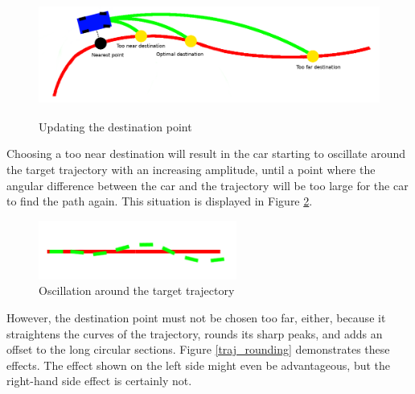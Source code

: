 \begin{figure}[!ht]
    \centering
    \includegraphics[height=40mm]{figures/raw/dest_point_update.png}
    \caption{Updating the destination point}
    \label{dest_point_update}
\end{figure}

Choosing a too near destination will result in the car starting to oscillate around the target trajectory with an increasing amplitude, until a point where the angular difference between the car and the trajectory will be too large for the car to find the path again. This situation is displayed in Figure \ref{traj_oscillation}.

\begin{figure}[!ht]
    \centering
    \includegraphics[width=65mm]{figures/raw/traj_oscillation.png}
    \caption{Oscillation around the target trajectory}
    \label{traj_oscillation}
\end{figure}

However, the destination point must not be chosen too far, either, because it straightens the curves of the trajectory, rounds its sharp peaks, and adds an offset to the long circular sections. Figure \ref{traj_rounding} demonstrates these effects. The effect shown on the left side might even be advantageous, but the right-hand side effect is certainly not.

